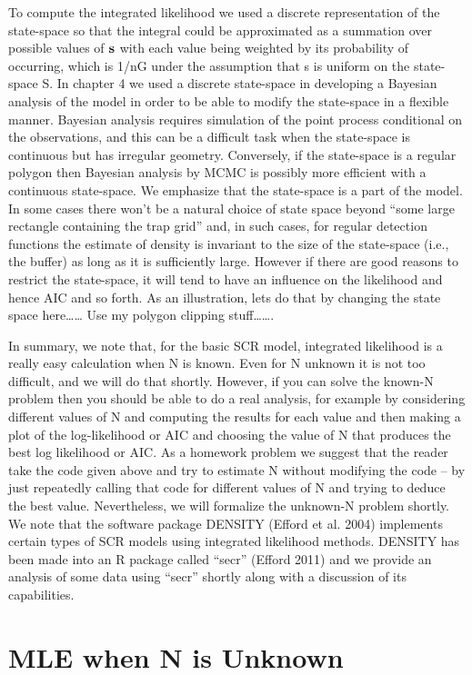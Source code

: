 To compute the integrated likelihood we used a discrete representation
of the state-space so that the integral could be approximated as a
summation over possible values of ${\bf s}$ with each value being
weighted by its probability of occurring, which is 1/nG under the
assumption that s is uniform on the state-space S. In chapter 4 we
used a discrete state-space in developing a Bayesian analysis of the
model in order to be able to modify the state-space in a flexible
manner. Bayesian analysis requires simulation of the point process
conditional on the observations, and this can be a difficult task when
the state-space is continuous but has irregular geometry.  Conversely,
if the state-space is a regular polygon then Bayesian analysis by MCMC
is possibly more efficient with a continuous state-space. We emphasize
that the state-space is a part of the model. In some cases there won’t
be a natural choice of state space beyond “some large rectangle
containing the trap grid” and, in such cases, for regular detection
functions the estimate of density is invariant to the size of the
state-space (i.e., the buffer) as long as it is sufficiently
large. However if there are good reasons to restrict the state-space,
it will tend to have an influence on the likelihood and hence AIC and
so forth.  As an illustration, lets do that by changing the state
space here…… Use my polygon clipping stuff…….

In summary, we note that, for the basic SCR model, integrated
likelihood is a really easy calculation when N is known. Even for N
unknown it is not too difficult, and we will do that shortly.
However, if you can solve the known-N problem then you should be able
to do a real analysis, for example by considering different values of
N and computing the results for each value and then making a plot of
the log-likelihood or AIC and choosing the value of N that produces
the best log likelihood or AIC. As a homework problem we suggest that
the reader take the code given above and try to estimate N without
modifying the code – by just repeatedly calling that code for
different values of N and trying to deduce the best value.
Nevertheless, we will formalize the unknown-N problem shortly.  We
note that the software package DENSITY (Efford et al. 2004) implements
certain types of SCR models using integrated likelihood methods.
DENSITY has been made into an R package called “secr” (Efford 2011)
and we provide an analysis of some data using “secr” shortly along
with a discussion of its capabilities.


\section{MLE when N is Unknown} 


